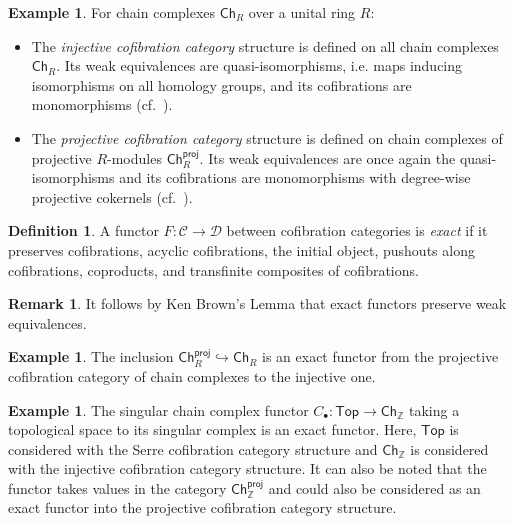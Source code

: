 \documentclass[11pt]{article}
\theoremstyle{definition}
\newtheorem{defi}[theo]{Definition}
\newtheorem{remark}[theo]{Remark}
\newtheorem{example}[theo]{Example}
\numberwithin{equation}{section}
\newcommand{\C}{\mathcal{C}}
\newcommand{\D}{\mathcal{D}}
\newcommand{\Ch}{\mathsf{Ch}}
\newcommand{\Top}{\mathsf{Top}}
\newcommand{\proj}{\mathsf{proj}}
\newcommand{\into}{\hookrightarrow}
\newcommand{\from}{\colon}
\begin{document}
\begin{example}\label{Ch-cof-cat}
  For chain complexes $\Ch_R$ over a unital ring $R$:
  \begin{itemize}
      \item The \emph{injective cofibration category} structure is defined on all chain complexes $\Ch_R$. Its weak equivalences are quasi-isomorphisms, i.e. maps inducing isomorphisms on all homology groups, and its cofibrations are monomorphisms (cf.~\cite[Thm.~2.3.13]{hovey:book}).
      \item The \emph{projective cofibration category} structure is defined on chain complexes of projective $R$-modules $\Ch_R^\proj$. Its weak equivalences are once again the quasi-isomorphisms and its cofibrations are monomorphisms with degree-wise projective cokernels (cf.~\cite[Thm.~2.3.11]{hovey:book}).
  \end{itemize}
\end{example}

\begin{defi}
  A functor $F \from \C \to \D$ between cofibration categories is \emph{exact} if it preserves cofibrations, acyclic cofibrations, the initial object, pushouts along cofibrations, coproducts, and transfinite composites of cofibrations.
\end{defi}

\begin{remark} \label{rem:ken-brown}
    It follows by Ken Brown's Lemma \cite[Lem.~1.1.12]{hovey:book} that exact functors preserve weak equivalences.
\end{remark}

\begin{example}\label{Ch-inclusion-exact}
  The inclusion $\Ch_R^\proj \into \Ch_R$ is an exact functor from the projective cofibration category of chain complexes to the injective one.
\end{example}

\begin{example}
  The singular chain complex functor $C_\bullet  \from \Top \to \Ch_\mathbb{Z}$ taking a topological space to its singular complex is an exact functor.
  Here, $\Top$ is considered with the Serre cofibration category structure and $\Ch_\mathbb{Z}$ is considered with the injective cofibration category structure.
  It can also be noted that the functor takes values in the category $\Ch_\mathbb{Z}^\mathsf{proj}$ and could also be considered as an exact functor into the projective cofibration category structure.
\end{example}
\end{document}
